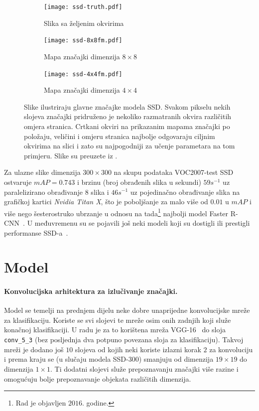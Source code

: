 \documentclass[utf8, seminar, numeric, lmodern]{feri}
\begin{document}
\begin{figure}[htbp] \centering
	\begin{subfigure}[b]{0.32\textwidth} \centering
		\texttt{[image: ssd-truth.pdf]}
		\caption{Slika sa željenim okvirima}
	\end{subfigure}
    \begin{subfigure}[b]{0.32\textwidth} \centering
		\texttt{[image: ssd-8x8fm.pdf]}
		\caption{Mapa značajki dimenzija $8\times8$}
	\end{subfigure}
	\begin{subfigure}[b]{0.32\textwidth} \centering
		\texttt{[image: ssd-4x4fm.pdf]}
		\caption{Mapa značajki dimenzija $4\times4$}
	\end{subfigure}
	\caption{Slike ilustriraju glavne značajke modela SSD. Svakom pikselu nekih slojeva značajki pridruženo je nekoliko razmatranih okvira različitih omjera stranica. Crtkani okviri na prikazanim mapama značajki po položaju, veličini i omjeru stranica najbolje odgovaraju ciljnim okvirima na slici i zato su najpogodniji za učenje parametara na tom primjeru. Slike su preuzete iz \cite{ssd}.}
	\label{fig:ssd-default-boxes}
\end{figure}

Za ulazne slike dimenzija $300\times300$ na skupu podataka VOC2007-test SSD ostvaruje $\mathit{mAP}=0.743$ i brzinu (broj obrađenih slika u sekundi) $59 s^{-1}$ uz paralelizirano obrađivanje 8 slika i $46 s^{-1}$ uz pojedinačno obrađivanje slika na grafičkoj kartici \emph{Nvidia Titan X}, što je poboljšanje za malo više od $0.01$ u $\mathit{mAP}$ i više nego šesterostruko ubrzanje u odnosu na tada\footnote{Rad je objavljen $2016$. godine.} najbolji model Faster R-CNN~\cite{fasterrcnn}.
U međuvremenu su se pojavili još neki modeli koji su dostigli ili prestigli performanse SSD-a~\cite{pvanet, yolov2}. 


\section{Model} \label{sec:ssd-model}

\paragraph{Konvolucijska arhitektura za izlučivanje značajki.}
Model se temelji na prednjem dijelu neke dobre unaprijedne konvolucijske mreže za klasifikaciju. Koriste se svi slojevi te mreže osim onih zadnjih koji služe konačnoj klasifikaciji. U radu je za to korištena mreža VGG-16~\cite{vgg} do sloja \texttt{conv\_5\_3} (bez posljednja dva potpuno povezana sloja za klasifikaciju). Takvoj mreži je dodano još $10$ slojeva od kojih neki koriste izlazni korak $2$ za konvoluciju i prema kraju se (u slučaju modela SSD-300) smanjuju od dimenzija $19\times 19$ do dimenzija $1\times 1$. Ti dodatni slojevi služe prepoznavanju značajki više razine i omogućuju bolje prepoznavanje objekata različitih dimenzija. 
\end{document}
